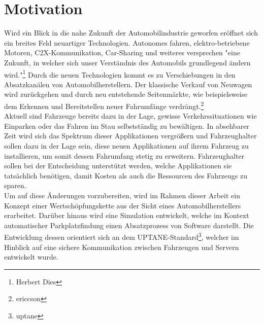 \setcounter{page}{1}
\section{Motivation}
Wird ein Blick in die nahe Zukunft der Automobilindustrie geworfen eröffnet sich ein  breites Feld neuartiger Technologien. Autonomes fahren, elektro-betriebene Motoren, C2X-Kommunikation, Car-Sharing und weiteres versprechen "eine Zukunft, in welcher sich unser Verständnis des Automobils grundlegend ändern wird."\footnote{Herbert Dies} Durch die neuen Technologien kommt es zu Verschiebungen in den Absatzkanälen von Automobilherstellern. Der klassische Verkauf von Neuwagen wird zurückgehen und durch neu entstehende Seitenmärkte, wie beispielsweise dem Erkennen und Bereitstellen neuer Fahrumfänge verdrängt.\footnote{ericcson}\\

Aktuell sind Fahrzeuge bereits dazu in der Lage, gewisse Verkehrssituationen wie Einparken oder das Fahren im Stau selbstständig zu bewältigen. In absehbarer Zeit wird sich das Spektrum dieser Applikationen vergrößern und Fahrzeughalter sollen dazu in der Lage sein, diese neuen Applikationen auf ihrem Fahrzeug zu installieren, um somit dessen Fahrumfang stetig zu erweitern. Fahrzeughalter sollen bei der Entscheidung unterstützt werden, welche Applikationen sie tatsächlich benötigen, damit Kosten als auch die Ressourcen des Fahrzeugs zu sparen.\\

Um auf diese Änderungen vorzubereiten, wird im Rahmen dieser Arbeit ein Konzept einer Wertschöpfungskette aus der Sicht eines Automobilherstellers erarbeitet. Darüber hinaus wird eine Simulation entwickelt, welche im Kontext automatischer Parkplatzfindung einen Absatzprozess von Software darstellt. Die Entwicklung dessen orientiert sich an dem UPTANE-Standard\footnote{uptane}, welcher im Hinblick auf eine sichere Kommunikation zwischen Fahrzeugen und Servern entwickelt wurde.\\